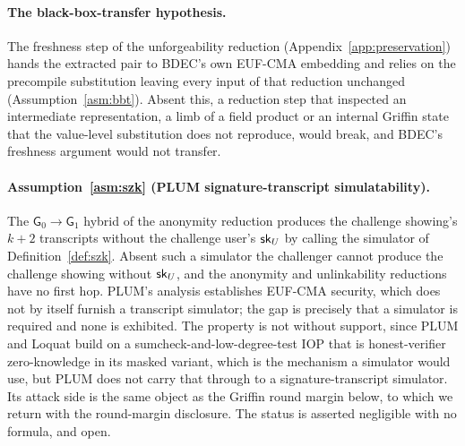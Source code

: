%

\paragraph{The black-box-transfer hypothesis.}
The freshness step of the unforgeability reduction (Appendix~\ref{app:preservation}) hands the extracted pair to BDEC's own EUF-CMA embedding and relies on the precompile substitution leaving every input of that reduction unchanged (Assumption~\ref{asm:bbt}). Absent this, a reduction step that inspected an intermediate representation, a limb of a field product or an internal Griffin state that the value-level substitution does not reproduce, would break, and BDEC's freshness argument would not transfer.

\paragraph{Assumption~\ref{asm:szk} (PLUM signature-transcript simulatability).}
The $\mathsf G_0\to\mathsf G_1$ hybrid of the anonymity reduction produces the challenge showing's $k+2$ transcripts without the challenge user's $\mathsf{sk}_U$ by calling the simulator of Definition~\ref{def:szk}. Absent such a simulator the challenger cannot produce the challenge showing without $\mathsf{sk}_U$, and the anonymity and unlinkability reductions have no first hop. PLUM's analysis establishes EUF-CMA security, which does not by itself furnish a transcript simulator; the gap is precisely that a simulator is required and none is exhibited. The property is not without support, since PLUM and Loquat build on a sumcheck-and-low-degree-test IOP that is honest-verifier zero-knowledge in its masked variant, which is the mechanism a simulator would use, but PLUM does not carry that through to a signature-transcript simulator. Its attack side is the same object as the Griffin round margin below, to which we return with the round-margin disclosure. The status is asserted negligible with no formula, and open.

